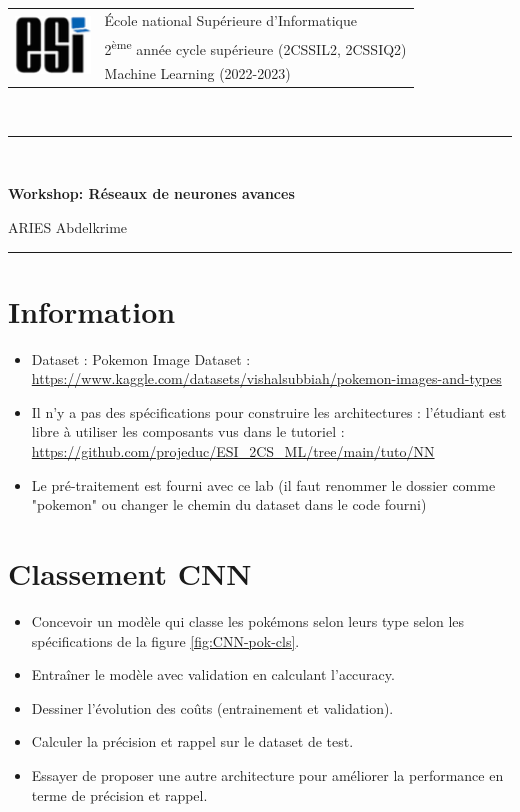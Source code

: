\documentclass[11pt, a4paper]{article}
\begin{document}

\noindent
\begin{tabular}{ll}
\multirow{3}{*}{\includegraphics[width=2cm]{../img/esi-logo.png}} & \'Ecole national Supérieure d'Informatique\\
& 2\textsuperscript{ème} année cycle supérieure (2CSSIL2, 2CSSIQ2)\\
& Machine Learning (2022-2023)
\end{tabular}\\[.25cm]
\noindent\rule{\textwidth}{1pt}\\%
\begin{center}
{\LARGE \textbf{Workshop: Réseaux de neurones avances}}
\begin{flushright}
	ARIES Abdelkrime
\end{flushright}
\end{center}
\noindent\rule{\textwidth}{1pt}

\section*{Information}

\begin{itemize}
	\item Dataset : Pokemon Image Dataset : {\scriptsize\url{https://www.kaggle.com/datasets/vishalsubbiah/pokemon-images-and-types}}
	\item Il n'y a pas des spécifications pour construire les architectures : l'étudiant est libre à utiliser les composants vus dans le tutoriel : {\scriptsize \url{https://github.com/projeduc/ESI_2CS_ML/tree/main/tuto/NN}}
	\item Le pré-traitement est fourni avec ce lab (il faut renommer le dossier comme "pokemon" ou changer le chemin du dataset dans le code fourni)
\end{itemize}

\section{Classement CNN}

\begin{itemize}
	\item Concevoir un modèle qui classe les pokémons selon leurs type selon les spécifications de la figure \ref{fig:CNN-pok-cls}.
	\item Entraîner le modèle avec validation en calculant l'accuracy.
	\item Dessiner l'évolution des coûts (entrainement et validation).
	\item Calculer la précision et rappel sur le dataset de test.
	\item Essayer de proposer une autre architecture pour améliorer la performance en terme de précision et rappel.
\end{itemize}
\end{document}

